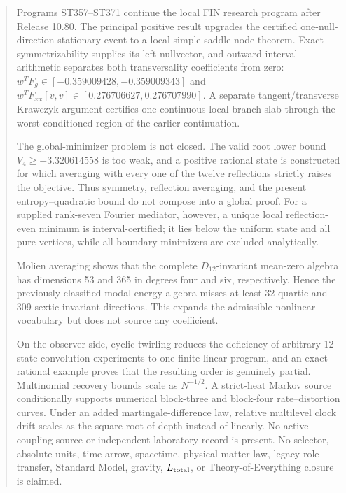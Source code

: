 \documentclass[11pt,a4paper]{article}
\begin{document}
\begin{abstract}
Programs ST357--ST371 continue the local FIN research program after Release 10.80. The
principal positive result upgrades the certified one-null-direction stationary event to a
local simple saddle-node theorem. Exact symmetrizability supplies its left nullvector, and
outward interval arithmetic separates both transversality coefficients from zero:
$w^TF_g\in[-0.359009428,-0.359009343]$ and
$w^TF_{xx}[v,v]\in[0.276706627,0.276707990]$. A separate tangent/transverse Krawczyk
argument certifies one continuous local branch slab through the worst-conditioned region of
the earlier continuation.

The global-minimizer problem is not closed. The valid root lower bound
$V_4\geq-3.320614558$ is too weak, and a positive rational state is constructed for which
averaging with every one of the twelve reflections strictly raises the objective. Thus
symmetry, reflection averaging, and the present entropy--quadratic bound do not compose into
a global proof. For a supplied rank-seven Fourier mediator, however, a unique local
reflection-even minimum is interval-certified; it lies below the uniform state and all pure
vertices, while all boundary minimizers are excluded analytically.

Molien averaging shows that the complete $D_{12}$-invariant mean-zero algebra has dimensions
53 and 365 in degrees four and six, respectively. Hence the previously classified modal
energy algebra misses at least 32 quartic and 309 sextic invariant directions. This expands
the admissible nonlinear vocabulary but does not source any coefficient.

On the observer side, cyclic twirling reduces the deficiency of arbitrary 12-state
convolution experiments to one finite linear program, and an exact rational example proves
that the resulting order is genuinely partial. Multinomial recovery bounds scale as
$N^{-1/2}$. A strict-heat Markov source conditionally supports numerical block-three and
block-four rate--distortion curves. Under an added martingale-difference law, relative
multilevel clock drift scales as the square root of depth instead of linearly. No active
coupling source or independent laboratory record is present. No selector, absolute units,
time arrow, spacetime, physical matter law, legacy-role transfer, Standard Model, gravity,
$L_{\rm total}$, or Theory-of-Everything closure is claimed.
\end{abstract}
\tableofcontents\newpage{}
\end{document}
